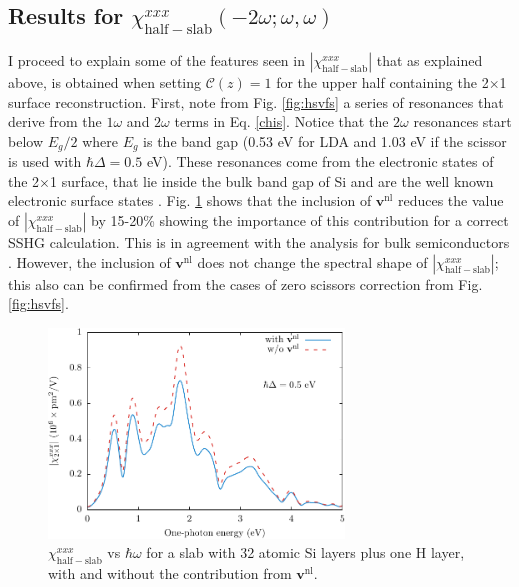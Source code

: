 {%

\subsection{
\texorpdfstring{Results for $\chi^{xxx}_{\mathrm{half-slab}}
(-2\omega;\omega,\omega)$}
{Results for Xxxx(half-slab)(-2w;w,w)}}

I proceed to explain some of the features seen in
$|\chi^{xxx}_{\mathrm{half-slab}}|$ that as explained above, is obtained when
setting ${\mathbf{\mathcal{C}}}(z)=1$ for the upper half containing the
2$\times$1 surface reconstruction. First, note from Fig. \ref{fig:hsvfs} a
series of resonances that derive from the $1\omega$ and $2\omega$ terms in Eq.
\eqref{chis}. Notice that the $2\omega$ resonances start below $E_{g}/2$ where
$E_{g}$ is the band gap (0.53 eV for LDA and 1.03 eV if the scissor is used with
$\hbar\Delta=0.5$ eV). These resonances come from the electronic states of the
2$\times$1 surface, that lie inside the bulk band gap of Si and are the well
known electronic surface states \cite{rohlfingPRB95}. Fig. \ref{fig:vnl} shows
that the inclusion of $\mathbf{v}^\mathrm{nl}$ reduces the value of
$|\chi^{xxx}_{\mathrm{half-slab}}|$ by 15-20\% showing the importance of this
contribution for a correct SSHG calculation. This is in agreement with the
analysis for bulk semiconductors \cite{luppiPRB08}. However, the inclusion of
$\mathbf{v}^\mathrm{nl}$ does not change the spectral shape of
$|\chi^{xxx}_{\mathrm{half-slab}}|$; this also can be confirmed from the cases
of zero scissors correction from Fig. \ref{fig:hsvfs}.

\begin{figure}
\centering 
\includegraphics[width=0.7\textwidth]{content/figures/fig-4_1_04}
\caption{$\chi^{xxx}_{\mathrm{half-slab}}$ vs $\hbar\omega$ for a slab with 32
atomic Si layers plus one H layer, with and without the contribution from
$\mathbf{v}^\mathrm{nl}$.}
\label{fig:vnl}
\end{figure}

}
